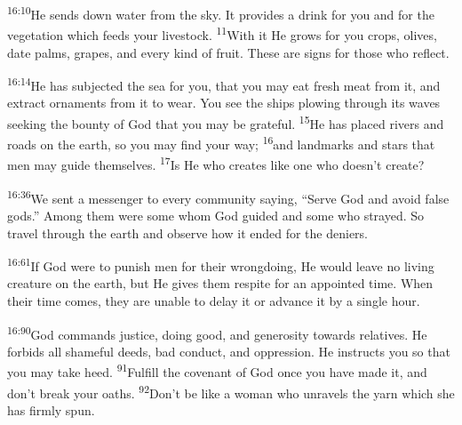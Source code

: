 \documentclass[openany,12pt,english]{book}
\newenvironment{para}{\par\pretolerance=100\tolerance=200\setlength{\emergencystretch}{0.6em}\relax}{\par}
\begin{document}
\begin{para}
    \textsuperscript{16:10}\thinspace{}He sends down wa\-ter from the sky. It provides a drink for you and for the veg\-e\-ta\-tion which feeds your live\-stock.
    \textsuperscript{11}\thinspace{}With it He grows for you crops, olives, date palms, grapes, and eve\-ry kind of fruit. These are signs for those who re\-flect.
\end{para}

\begin{para}
    \textsuperscript{16:14}\thinspace{}He has subjected the sea for you, that you may eat fresh meat from it, and ex\-tract ornaments from it to wear. You see the ships plowing through its waves seek\-ing the boun\-ty of God that you may be grate\-ful.
    \textsuperscript{15}\thinspace{}He has placed rivers and roads on the earth, so you may find your way;
    \textsuperscript{16}\thinspace{}and landmarks and stars that men may guide them\-selves.
    \textsuperscript{17}\thinspace{}Is He who creates like one who does\-n't cre\-ate?
\end{para}

\begin{para}
    \textsuperscript{16:36}\thinspace{}We sent a mes\-sen\-ger to eve\-ry com\-mu\-ni\-ty say\-ing, “Serve God and a\-void false gods.” A\-mong them were some whom God guid\-ed and some who strayed. So trav\-el through the earth and ob\-serve how it ended for the deniers.
\end{para}

\begin{para}
    \textsuperscript{16:61}\thinspace{}If God were to pun\-ish men for their wrong\-do\-ing, He would leave no liv\-ing crea\-ture on the earth, but He gives them res\-pite for an ap\-point\-ed time. When their time co\-mes, they are un\-a\-ble to de\-lay it or ad\-vance it by a sin\-gle hour.
\end{para}

\begin{para}
    \textsuperscript{16:90}\thinspace{}God commands jus\-tice, do\-ing good, and gen\-er\-os\-i\-ty to\-wards relatives. He forbids all shame\-ful deeds, bad con\-duct, and op\-pres\-sion. He instructs you so that you may take heed.
    \textsuperscript{91}\thinspace{}Ful\-fill the cov\-e\-nant of God once you have made it, and don't break your oaths.
    \textsuperscript{92}\thinspace{}Don't be like a wom\-an who unravels the yarn which she has firm\-ly spun.
\end{para}
\end{document}
